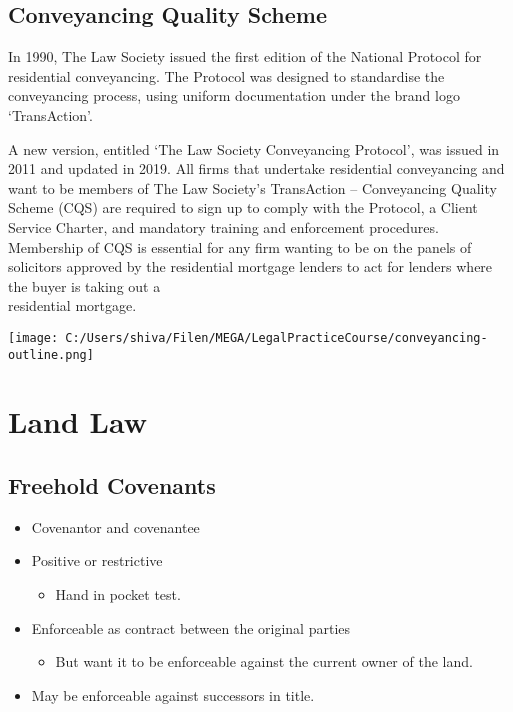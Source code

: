 \documentclass[
]{article}
\providecommand{\tightlist}{%
  \setlength{\itemsep}{0pt}\setlength{\parskip}{0pt}}
\begin{document}
\hypertarget{conveyancing-quality-scheme}{%
\subsection{Conveyancing Quality
Scheme}\label{conveyancing-quality-scheme}}

In 1990, The Law Society issued the first edition of the National
Protocol for residential conveyancing. The Protocol was designed to
standardise the conveyancing process, using uniform documentation under
the brand logo `TransAction'.

A new version, entitled `The Law Society Conveyancing Protocol', was
issued in 2011 and updated in 2019. All firms that undertake residential
conveyancing and want to be members of The Law Society's TransAction --
Conveyancing Quality Scheme (CQS) are required to sign up to comply with
the Protocol, a Client Service Charter, and mandatory training and
enforcement procedures. Membership of CQS is essential for any firm
wanting to be on the panels of solicitors approved by the residential
mortgage lenders to act for lenders where the buyer is taking out a\\
residential mortgage.

\texttt{[image: C:/Users/shiva/Filen/MEGA/LegalPracticeCourse/conveyancing-outline.png]}

\hypertarget{land-law}{%
\section{Land Law}\label{land-law}}

\hypertarget{freehold-covenants}{%
\subsection{Freehold Covenants}\label{freehold-covenants}}

\begin{itemize}
\tightlist
\item
  Covenantor and covenantee
\item
  Positive or restrictive

  \begin{itemize}
  \tightlist
  \item
    Hand in pocket test.
  \end{itemize}
\item
  Enforceable as contract between the original parties

  \begin{itemize}
  \tightlist
  \item
    But want it to be enforceable against the current owner of the land.
  \end{itemize}
\item
  May be enforceable against successors in title.
\end{itemize}
\end{document}
